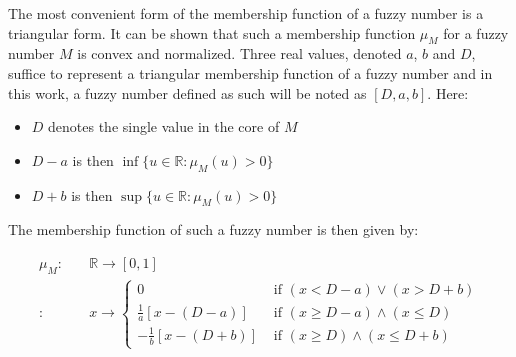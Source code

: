 
%  

The most convenient form of the membership function of a fuzzy number is a triangular form. It can be shown that such a membership function $\mu_M$ for a fuzzy number $M$ is convex and normalized. Three real values, denoted $a$, $b$ and $D$, suffice to represent a triangular membership function of a fuzzy number and in this work, a fuzzy number defined as such will be noted as $\left[D, a, b \right]$. Here:
\begin{itemize}
\item
$D$ denotes the single value in the core of $M$
\item
$D-a$ is then $\inf \{u \in \mathbb{R} : \mu_{M}(u) > 0\}$
\item
$D+b$ is then $\sup \{u \in \mathbb{R} : \mu_{M}(u) > 0\}$
\end{itemize}

The membership function of such a fuzzy number is then given by:

\vspace{-10pt}

\begin{align}
\mu_M : & \quad \mathbb{R} \rightarrow \left[0,1\right] \nonumber\\
 : & \quad x \rightarrow
\begin{cases}
0 & \mbox{ if } \left(x < D-a\right) \vee \left(x > D+b\right) \\
\frac{1}{a}\left[x-\left(D-a\right)\right] & \mbox{ if } \left(x \geq D-a\right) \wedge (x \leq D)  \\
-\frac{1}{b}\left[x-\left(D+b\right)\right] & \mbox{ if } \left(x \geq D\right) \wedge (x \leq D+b)
\end{cases}
\end{align}

